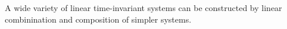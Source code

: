 A wide variety of linear time-invariant systems can be constructed by linear combinination and composition of simpler systems.  






